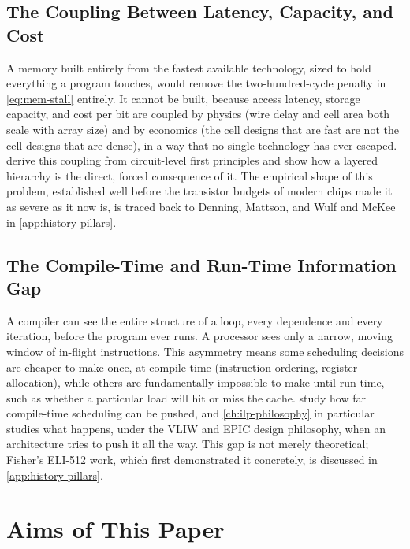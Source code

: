 \documentclass[12pt,a4paper]{report}
\begin{document}
\subsection{The Coupling Between Latency, Capacity, and Cost}
A memory built entirely from the fastest available technology, sized to
hold everything a program touches, would remove the two-hundred-cycle
penalty in \cref{eq:mem-stall} entirely. It cannot be built, because
access latency, storage capacity, and cost per bit are coupled by
physics (wire delay and cell area both scale with array size) and by
economics (the cell designs that are fast are not the cell designs that
are dense), in a way that no single technology has ever escaped.
 derive this coupling from circuit-level
first principles and show how a layered hierarchy is the direct, forced
consequence of it. The empirical shape of this problem, established
well before the transistor budgets of modern chips made it as severe as
it now is, is traced back to Denning, Mattson, and Wulf and McKee in
\cref{app:history-pillars}.

\subsection{The Compile-Time and Run-Time Information Gap}
A compiler can see the entire structure of a loop, every dependence and
every iteration, before the program ever runs. A processor sees only a
narrow, moving window of in-flight instructions. This asymmetry means
some scheduling decisions are cheaper to make once, at compile time
(instruction ordering, register allocation), while others are
fundamentally impossible to make until run time, such as whether a
particular load will hit or miss the cache.
 study how far
compile-time scheduling can be pushed, and \cref{ch:ilp-philosophy} in
particular studies what happens, under the VLIW and EPIC design
philosophy, when an architecture tries to push it all the way. This gap
is not merely theoretical; Fisher's ELI-512 work, which first
demonstrated it concretely, is discussed in \cref{app:history-pillars}.

\section{Aims of This Paper}
\label{sec:aims}
\end{document}

